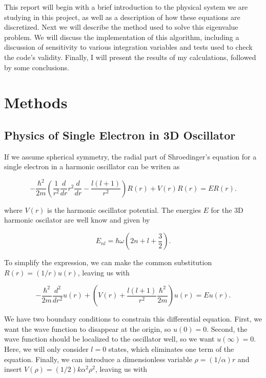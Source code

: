 \documentclass[%
oneside,                 %
final,                   %
10pt]{article}
\begin{document}
This report will begin with a brief introduction to the physical system we are studying in this project, as well as a description of how these equations are discretized.  Next we will describe the method used to solve this eigenvalue problem.  We will discuss the implementation of this algorithm, including a discussion of sensitivity to various integration variables and tests used to check the code's validity.  Finally, I will present the results of my calculations, followed by some conclusions.
\section{Methods}

\subsection{Physics of Single Electron in 3D Oscillator}

If we assume spherical symmetry, the radial part of Shroedinger's equation for a single electron in a harmonic oscillator can be writen as

\begin{equation*}
  -\frac{\hbar^2}{2 m} \left ( \frac{1}{r^2} \frac{d}{dr} r^2
  \frac{d}{dr} - \frac{l (l + 1)}{r^2} \right )R(r) 
     + V(r) R(r) = E R(r).
\end{equation*}

where $V(r)$ is the harmonic oscillator potential.  The energies $E$ for the 3D harmonic oscilator are well know and given by

\begin{equation*}
E_{nl}=  \hbar \omega \left(2n+l+\frac{3}{2}\right).
\end{equation*}

To simplify the expression, we can make the common substitution $R(r) = (1/r) u(r)$, leaving us with
% 

\begin{equation*}
  -\frac{\hbar^2}{2 m} \frac{d^2}{dr^2} u(r) 
       + \left ( V(r) + \frac{l (l + 1)}{r^2}\frac{\hbar^2}{2 m}
                                    \right ) u(r)  = E u(r) .
\end{equation*}
% 

We have two boundary conditions to constrain this differential equation.  First, we want the wave function to disappear at the origin, so $u(0)=0$.  Second, the wave function should be localized to the oscillator well, so we want $u(\infty)=0$.  Here, we will only consider $l=0$ states, which eliminates one term of the equation.  Finally, we can introduce a dimensionless variable $\rho = (1/\alpha) r$ and insert  $V(\rho) = (1/2) k \alpha^2\rho^2$, leaving us with
\end{document}
